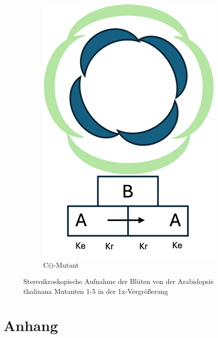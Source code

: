 \documentclass[10pt,a4paper]{article}
\begin{document}
\begin{figure}[H]
\begin{subfigure}[b]{0.3\textwidth}
				\includegraphics[width=\textwidth]{C-Mutant_diagramm.png}
				\caption{C$\ominus$-Mutant}
				\label{fig:C-Mutant}
			\end{subfigure}
	
			\caption{Stereoikroskopische Aufnahme der Blüten von der Arabidopsis thalinana Mutanten 1-5 in der 1x-Vergrößerung}
		\end{figure}
		
		

	\section{Anhang}

	

	
\end{document}
